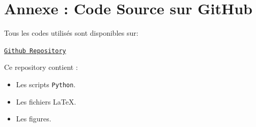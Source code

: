 \documentclass[]{book}
\begin{document}
\appendix
\section*{Annexe : Code Source sur GitHub}

Tous les codes utilisés sont disponibles sur:

\begin{center}
\href{https://github.com/elghemary/MID-math-2025/tree/main/Recherche%20Operationnelle}{\texttt{Github Repository}}
\end{center}

Ce repository contient :
\begin{itemize}
    \item Les scripts \texttt{Python}.
    \item Les fichiers \LaTeX{}.
    \item Les figures.
\end{itemize}
\end{document}
